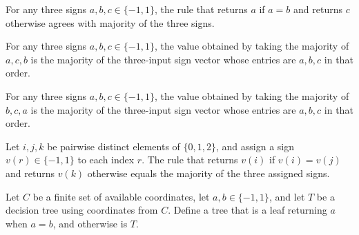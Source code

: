 \begin{theorem}
\label{FABL.majorityThreePairValue_eq_majority}
\leanok
{}
For any three signs $a,b,c\in\{-1,1\}$, the rule that returns $a$ if $a=b$ and returns
$c$ otherwise agrees with majority of the three signs.
\end{theorem}

\begin{theorem}
\label{FABL.majorityThreePairValue_swap_second_third}
\leanok
{}
For any three signs $a,b,c\in\{−1,1\}$, the value obtained by taking the majority of
$a,c,b$ is the majority of the three-input sign vector whose entries are $a,b,c$ in that
order.
\end{theorem}

\begin{theorem}
\label{FABL.majorityThreePairValue_rotate}
\leanok
{}
For any three signs $a,b,c\in\{−1,1\}$, the value obtained by taking the majority of
$b,c,a$ is the majority of the three-input sign vector whose entries are $a,b,c$ in that
order.
\end{theorem}

\begin{theorem}
\label{FABL.majorityThreePairValue_permutation}
\leanok
{}
Let $i,j,k$ be pairwise distinct elements of $\{0,1,2\}$, and assign a sign
$v(r)\in\{-1,1\}$ to each index $r$. The rule that returns $v(i)$ if $v(i)=v(j)$ and
returns $v(k)$ otherwise equals the majority of the three assigned signs.
\end{theorem}

\begin{definition}
\label{FABL.majorityThreeContinuationTree}
\leanok
{}
Let $C$ be a finite set of available coordinates, let $a,b\in\{-1,1\}$, and let $T$ be a
decision tree using coordinates from $C$. Define a tree that is a leaf returning $a$
when $a=b$, and otherwise is $T$.
\end{definition}

